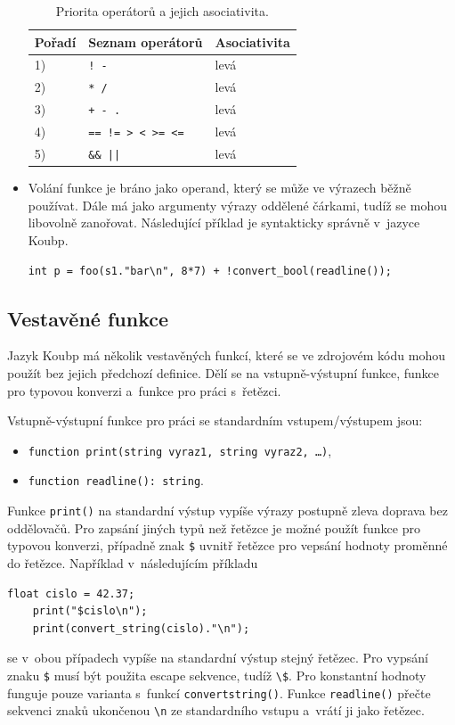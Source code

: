 \begin{itemize}
    \begin{table}[ht]
        \centering
        \begin{tabularx}{0.7\textwidth}{p{}p{}X}
            \toprule
            \textbf{Pořadí} & \textbf{Seznam operátorů} & \textbf{Asociativita} \\
            \midrule
            1) & \texttt{! -} & levá \\
            2) & \texttt{* /} & levá \\
            3) & \texttt{+ - .} & levá \\
            4) & \texttt{== != > < >= <=} & levá \\
            5) & \texttt{\&\& ||} & levá \\
            \bottomrule
        \end{tabularx}
        \caption{Priorita operátorů a jejich asociativita.}
        \label{tab_priorita_operatoru}
    \end{table}
    \item Volání funkce je bráno jako operand, který se může ve výrazech běžně používat.
    Dále má jako argumenty výrazy oddělené čárkami, tudíž se mohou libovolně zanořovat.
    Následující příklad je syntakticky správně v~jazyce Koubp.
    \begin{lstlisting}[language=Koubp]
        int p = foo(s1."bar\n", 8*7) + !convert_bool(readline());
    \end{lstlisting}
\end{itemize}

\subsection*{Vestavěné funkce}
Jazyk Koubp má několik vestavěných funkcí, které se ve zdrojovém kódu mohou použít bez jejich předchozí definice.
Dělí se na vstupně-výstupní funkce, funkce pro typovou konverzi a~funkce pro práci s~řetězci.

Vstupně-výstupní funkce pro práci se standardním vstupem/výstupem jsou:
\begin{itemize}
    \item \texttt{function print(string vyraz1, string vyraz2, \ldots)},
    \item \texttt{function readline(): string}.
\end{itemize}
Funkce \texttt{print()} na standardní výstup vypíše výrazy postupně zleva doprava bez oddělovačů.
Pro zapsání jiných typů než řetězce je možné použít funkce pro typovou konverzi, případně znak \texttt{\$} uvnitř řetězce pro vepsání hodnoty proměnné do řetězce.
Například v~následujícím příkladu
\begin{lstlisting}[language=Koubp]
    float cislo = 42.37;
    print("$cislo\n");
    print(convert_string(cislo)."\n");
\end{lstlisting}
se v~obou případech vypíše na standardní výstup stejný řetězec.
Pro vypsání znaku \texttt{\$} musí být použita escape sekvence, tudíž \texttt{\textbackslash\$}.
Pro konstantní hodnoty funguje pouze varianta s~funkcí \texttt{convert\textunderscore string()}.
Funkce \texttt{readline()} přečte sekvenci znaků ukončenou \texttt{\textbackslash n} ze standardního vstupu a~vrátí ji jako řetězec.


